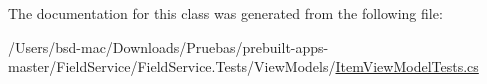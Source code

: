 The documentation for this class was generated from the following file\+:\begin{DoxyCompactItemize}
\item 
/\+Users/bsd-\/mac/\+Downloads/\+Pruebas/prebuilt-\/apps-\/master/\+Field\+Service/\+Field\+Service.\+Tests/\+View\+Models/\hyperlink{_item_view_model_tests_8cs}{Item\+View\+Model\+Tests.\+cs}\end{DoxyCompactItemize}
